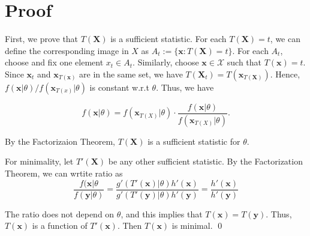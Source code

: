 \documentclass{article} %
\begin{document}
\section*{Proof}
First, we prove that $T(\boldsymbol X)$ is a sufficient statistic. For each $T(\boldsymbol X) = t$, we can define the corresponding image in $X$ as $A_t:= \{\boldsymbol x: T(\boldsymbol X) = t\}$. For each $A_t$, choose and fix one element $x_t \in A_t$. Similarly, choose $\boldsymbol x \in \mathcal{X}$ such that $T(\boldsymbol x) = t$. Since $\boldsymbol x_t$ and $\boldsymbol x_{T(\boldsymbol x)}$ are in the same set, we have $T(\boldsymbol X_t) = T(\boldsymbol x_{T(\boldsymbol X)})$. Hence, $f(\boldsymbol x|\theta)/f(\boldsymbol x_{T(x)}|\theta)$ is constant w.r.t $\theta$. Thus, we have

$$f(\boldsymbol x|\theta) = f(\boldsymbol x_{T(X)}|\theta) \cdot \frac{f(\boldsymbol x|\theta)}{f(\boldsymbol x_{T(X)}|\theta)}.$$

By the Factorizaion Theorem, $T(\boldsymbol X)$ is a sufficient statistic for $\theta$.

For minimality, let $T'(\boldsymbol X)$ be any other sufficient statistic. By the Factorization Theorem, we can wrtite ratio as
$$\frac{f(\boldsymbol x| \theta}{f(\boldsymbol y| \theta)} = \frac{g'(T'(\boldsymbol x)| \theta)h'(\boldsymbol x)}{g'(T'(\boldsymbol y)| \theta)h'(\boldsymbol y)} = \frac{h'(\boldsymbol x)}{h'(\boldsymbol y)}$$

The ratio does not depend on $\theta$, and this implies that $T(\boldsymbol x) = T(\boldsymbol y)$. Thus, $T(\boldsymbol x)$ is a function of $T'(\boldsymbol x)$. Then $T(\boldsymbol x)$ is minimal.
\qed
\end{document}
